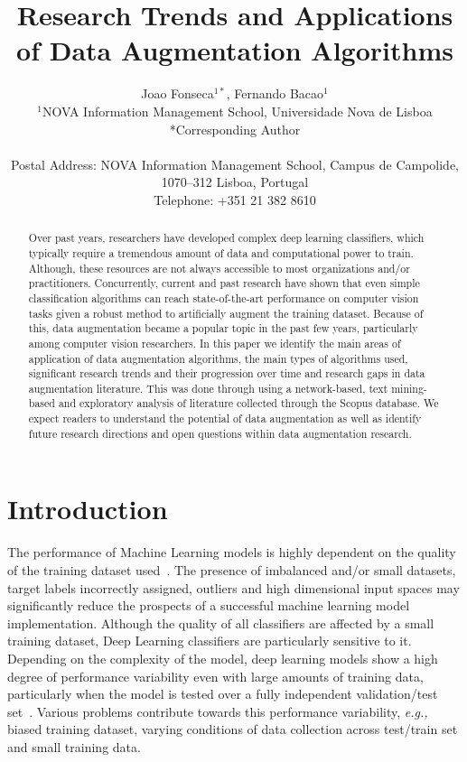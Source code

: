 \documentclass[parskip=full]{scrartcl}
\date{}
\title{%
    Research Trends and Applications of Data Augmentation Algorithms
}
\author{%
	Joao Fonseca\(^{1*}\), Fernando Bacao\(^{1}\)
	\\
	\small{\(^{1}\)NOVA Information Management School, Universidade Nova de Lisboa}
	\\
	\small{*Corresponding Author}
	\\
	\\
	\small{Postal Address: NOVA Information Management School, Campus de
    Campolide, 1070--312 Lisboa, Portugal}
	\\
	\small{Telephone: +351 21 382 8610}
}
\begin{document}
\maketitle

\begin{abstract}
    Over past years, researchers have developed complex deep learning
    classifiers, which typically require a tremendous amount of data and
    computational power to train. Although, these resources are not always
    accessible to most organizations and/or practitioners.  Concurrently,
    current and past research have shown that even simple classification
    algorithms can reach state-of-the-art performance on computer vision tasks
    given a robust method to artificially augment the training dataset.
    Because of this, data augmentation became a popular topic in the past few
    years, particularly among computer vision researchers. In this paper we
    identify the main areas of application of data augmentation algorithms,
    the main types of algorithms used, significant research trends and their
    progression over time and research gaps in data augmentation literature.
    This was done through using a network-based, text mining-based and
    exploratory analysis of literature collected through the Scopus database.
    We expect readers to understand the potential of data augmentation as well
    as identify future research directions and open questions within data
    augmentation research.
\end{abstract}

\section{Introduction}

The performance of Machine Learning models is highly dependent on the quality
of the training dataset used~\cite{Fenza2021}. The presence of imbalanced
and/or small datasets, target labels incorrectly assigned, outliers and high
dimensional input spaces may significantly reduce the prospects of a
successful machine learning model implementation. Although the quality of all
classifiers are affected by a small training dataset, Deep Learning
classifiers are particularly sensitive to it. Depending on the complexity of
the model, deep learning models show a high degree of performance variability
even with large amounts of training data, particularly when the model is
tested over a fully independent validation/test set~\cite{Hu2020}. Various
problems contribute towards this performance variability, \textit{e.g.,}
biased training dataset, varying conditions of data collection across
test/train set and small training data.
\end{document}
